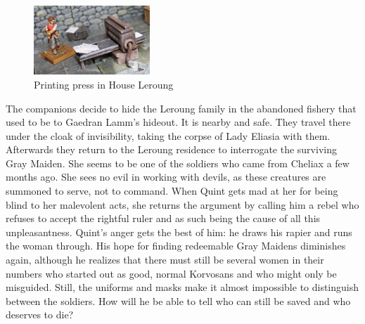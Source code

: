 \begin{figure}[h]
	\centering
	\includegraphics[width=0.39\textwidth]{images/Printing-press-in-House-Leroung-610271575.jpg}
	\caption{Printing press in House Leroung}
	\label{fig:Printing-press-in-House-Leroung-610271575}
\end{figure}

The companions decide to hide the Leroung family in the abandoned fishery that used to be to Gaedran Lamm's hideout. It is nearby and safe. They travel there under the cloak of invisibility, taking the corpse of Lady Eliasia with them. Afterwards they return to the Leroung residence to interrogate the surviving Gray Maiden. She seems to be one of the soldiers who came from Cheliax a few months ago. She sees no evil in working with devils, as these creatures are summoned to serve, not to command. When Quint gets mad at her for being blind to her malevolent acts, she returns the argument by calling him a rebel who refuses to accept the rightful ruler and as such being the cause of all this unpleasantness. Quint's anger gets the best of him: he draws his rapier and runs the woman through. His hope for finding redeemable Gray Maidens diminishes again, although he realizes that there must still be several women in their numbers who started out as good, normal Korvosans and who might only be misguided. Still, the uniforms and masks make it almost impossible to distinguish  between the soldiers. How will he be able to tell who can still be saved and who deserves to die?\\

